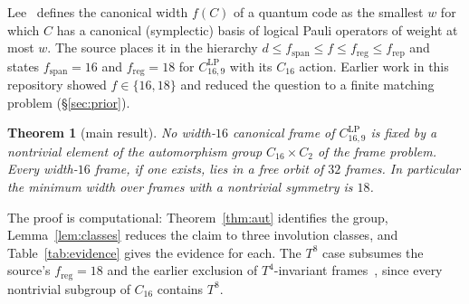 \documentclass[11pt]{article}
\newtheorem{theorem}{Theorem}
\theoremstyle{definition}
\theoremstyle{remark}
\newcommand{\CLP}{C^{\mathrm{LP}}_{16,9}}
\begin{document}
Lee~\cite{lee} defines the canonical width $f(C)$ of a quantum code as the smallest $w$ for which $C$ has a canonical (symplectic) basis of logical Pauli operators of weight at most $w$. The source places it in the hierarchy $d\le f_{\mathrm{span}}\le f\le f_{\mathrm{reg}}\le f_{\mathrm{rep}}$ and states $f_{\mathrm{span}}=16$ and $f_{\mathrm{reg}}=18$ for $\CLP$ with its $C_{16}$ action. Earlier work in this repository showed $f\in\{16,18\}$ and reduced the question to a finite matching problem (\S\ref{sec:prior}).

\begin{theorem}[main result]\label{thm:main}
No width-$16$ canonical frame of $\CLP$ is fixed by a nontrivial element of the automorphism group $C_{16}\times C_2$ of the frame problem. Every width-$16$ frame, if one exists, lies in a free orbit of $32$ frames. In particular the minimum width over frames with a nontrivial symmetry is $18$.
\end{theorem}

The proof is computational: Theorem~\ref{thm:aut} identifies the group, Lemma~\ref{lem:classes} reduces the claim to three involution classes, and Table~\ref{tab:evidence} gives the evidence for each. The $T^8$ case subsumes the source's $f_{\mathrm{reg}}=18$ and the earlier exclusion of $T^4$-invariant frames~\cite{structural}, since every nontrivial subgroup of $C_{16}$ contains $T^8$.
\end{document}
